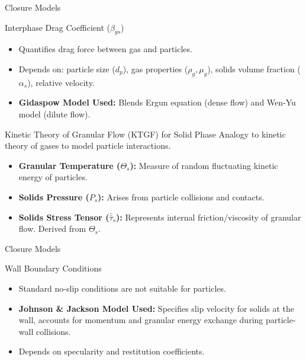 \documentclass[aspectratio=169]{beamer} %
\newcommand{\bi}{\begin{itemize}}
\newcommand{\ei}{\end{itemize}}
\newcommand{\im}{\item}
\begin{document}
\begin{frame}{Closure Models}
    \begin{block}{Interphase Drag Coefficient ($\beta_{gs}$)}
        \bi
            \im Quantifies drag force between gas and particles.
            \im Depends on: particle size ($d_p$), gas properties ($\rho_g, \mu_g$), solids volume fraction ($\alpha_s$), relative velocity.
            \im \textbf{Gidaspow Model Used:} Blends Ergun equation (dense flow) and Wen-Yu model (dilute flow).
        \ei
    \end{block}
    \begin{block}{Kinetic Theory of Granular Flow (KTGF) for Solid Phase}
        Analogy to kinetic theory of gases to model particle interactions.
        \bi
            \im \textbf{Granular Temperature ($\Theta_s$):} Measure of random fluctuating kinetic energy of particles.
            \im \textbf{Solids Pressure ($P_s$):} Arises from particle collisions and contacts.
            \im \textbf{Solids Stress Tensor ($\bar{\bar{\tau}}_s$):} Represents internal friction/viscosity of granular flow. Derived from $\Theta_s$.
        \ei
    \end{block}
\end{frame}

\begin{frame}{Closure Models}
    \begin{block}{Wall Boundary Conditions}
        \bi
            \im Standard no-slip conditions are not suitable for particles.
            \im \textbf{Johnson \& Jackson Model Used:} Specifies slip velocity for solids at the wall, accounts for momentum and granular energy exchange during particle-wall collisions.
            \im Depends on specularity and restitution coefficients.
        \ei
    \end{block} 
\end{frame}

\end{document}
